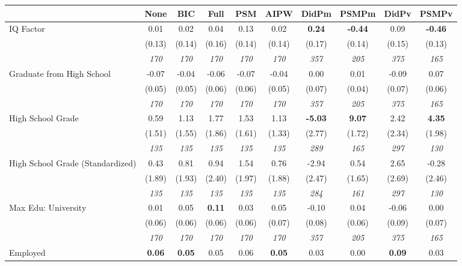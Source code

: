 \begin{tabular}{l c c c c c c c c c}
\toprule
 & None & BIC & Full & PSM & AIPW & DidPm & PSMPm & DidPv & PSMPv \\
\midrule
IQ Factor & 0.01 & 0.02 & 0.04 & 0.13 & 0.02 & \textbf{ 0.24 } & \textbf{-0.44} & 0.09 & \textbf{-0.46} \\
& (0.13) & (0.14) & (0.16) & (0.14) & (0.14) & (0.17) & (0.14) & (0.15) & (0.13) \\
& \textit{ 170 } & \textit{ 170 } & \textit{ 170 } & \textit{ 170 } & \textit{ 170 } & \textit{ 357 } & \textit{ 205 } & \textit{ 375 } & \textit{ 165 } \\
Graduate from High School & -0.07 & -0.04 & -0.06 & -0.07 & -0.04 & 0.00 & 0.01 & -0.09 & 0.07 \\
& (0.05) & (0.05) & (0.06) & (0.06) & (0.05) & (0.07) & (0.04) & (0.07) & (0.06) \\
& \textit{ 170 } & \textit{ 170 } & \textit{ 170 } & \textit{ 170 } & \textit{ 170 } & \textit{ 357 } & \textit{ 205 } & \textit{ 375 } & \textit{ 165 } \\
High School Grade & 0.59 & 1.13 & 1.77 & 1.53 & 1.13 & \textbf{ -5.03 } & \textbf{9.07} & 2.42 & \textbf{4.35} \\
& (1.51) & (1.55) & (1.86) & (1.61) & (1.33) & (2.77) & (1.72) & (2.34) & (1.98) \\
& \textit{ 135 } & \textit{ 135 } & \textit{ 135 } & \textit{ 135 } & \textit{ 135 } & \textit{ 289 } & \textit{ 165 } & \textit{ 297 } & \textit{ 130 } \\
High School Grade (Standardized) & 0.43 & 0.81 & 0.94 & 1.54 & 0.76 & -2.94 & 0.54 & 2.65 & -0.28 \\
& (1.89) & (1.93) & (2.40) & (1.97) & (1.88) & (2.47) & (1.65) & (2.69) & (2.46) \\
& \textit{ 135 } & \textit{ 135 } & \textit{ 135 } & \textit{ 135 } & \textit{ 135 } & \textit{ 284 } & \textit{ 161 } & \textit{ 297 } & \textit{ 130 } \\
Max Edu: University & 0.01 & 0.05 & \textbf{ 0.11 } & 0.03 & 0.05 & -0.10 & 0.04 & -0.06 & 0.00 \\
& (0.06) & (0.06) & (0.06) & (0.06) & (0.07) & (0.08) & (0.06) & (0.09) & (0.07) \\
& \textit{ 170 } & \textit{ 170 } & \textit{ 170 } & \textit{ 170 } & \textit{ 170 } & \textit{ 357 } & \textit{ 205 } & \textit{ 375 } & \textit{ 165 } \\
Employed & \textbf{ 0.06 } & \textbf{ 0.05 } & 0.05 & 0.06 & \textbf{0.05} & 0.03 & 0.00 & \textbf{ 0.09 } & 0.03 \\

\end{tabular}

